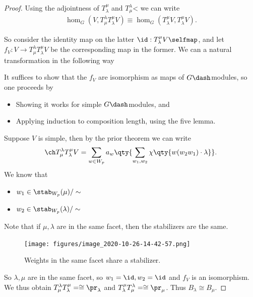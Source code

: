 \begin{proof}

Using the adjointness of \(T_\lambda^\mu\) and
\(T_\mu^\lambda\)\textless{} we can write
\begin{align*}  
\hom_G(V, T_\mu^\lambda T_\lambda^\mu V) \equiv
\hom_G(T_\lambda^\mu V,  T_\lambda^\mu V)
.\end{align*}

So consider the identity map on the latter
\(\id: T_\lambda^\mu V\selfmap\), and let
\(f_V: V\to T_\mu^\lambda T_\lambda^\mu V\) be the corresponding map in
the former. We can a natural transformation in the following way

\begin{center}
\end{center}

It suffices to show that the \(f_V\) are isomorphism as maps of
\(G\dash\)modules, so one proceeds by

\begin{itemize}
\item
  Showing it works for simple \(G\dash\)modules, and
\item
  Applying induction to composition length, using the five lemma.
\end{itemize}

Suppose \(V\) is simple, then by the prior theorem we can write
\begin{align*}  
\ch T_\mu^\lambda T_\lambda^\mu V = 
\sum_{w\in W_p} a_w \qty{\sum_{w_1, w_2} \chi\qty{w(w_2 w_1)\cdot \lambda } }
.\end{align*} We know that

\begin{itemize}
\tightlist
\item
  \(w_1\in \stab_{W_p}(\mu) / \sim\)
\item
  \(w_2\in \stab_{W_p}(\lambda) / \sim\)
\end{itemize}

Note that if \(\mu, \lambda\) are in the same facet, then the
stabilizers are the same.

\begin{figure}
\centering
\texttt{[image: figures/image\_2020-10-26-14-42-57.png]}
\caption{Weights in the same facet share a stabilizer.}
\end{figure}

So \(\lambda, \mu\) are in the same facet, so \(w_1 = \id, w_2 = \id\)
and \(f_V\) is an isomorphism. We thus obtain
\(T_\mu^\lambda T_\lambda^\mu =\cong \pr_\lambda\) and
\(T_\lambda^\mu T_\mu^\lambda =\cong \pr_\mu\). Thus
\(B_\lambda \cong B_\mu\).

\end{proof}


